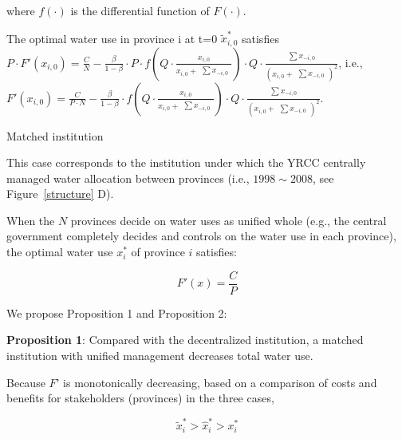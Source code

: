 \documentclass{../nsr}
\begin{document}
\begin{case}
    where $f(\cdot)$ is the differential function of $F(\cdot)$.

    The optimal water use in province i at t=0 $\widetilde x_{i,0}^*$ satisfies $P \cdot F'(x_{i,0})=\frac{C}{N}-\frac{\beta}{1-\beta} \cdot P \cdot f(Q \cdot \frac{x_{i,0}}{x_{i,0} + \begin{matrix} \sum x_{-i,0} \end{matrix}}) \cdot Q \cdot \frac{\begin{matrix} \sum x_{-i,0} \end{matrix}}{(x_{i,0} + \begin{matrix} \sum x_{-i,0} \end{matrix})^2}$, i.e., $F'(x_{i,0})=\frac{C}{P \cdot N} - \frac{\beta}{1-\beta} \cdot f(Q \cdot \frac{x_{i,0}}{x_{i,0} + \begin{matrix} \sum x_{-i,0} \end{matrix}}) \cdot Q \cdot \frac{\begin{matrix} \sum x_{-i,0} \end{matrix}}{(x_{i,0} + \begin{matrix} \sum x_{-i,0} \end{matrix})^2}$.

\end{case}

\begin{case} Matched institution

    This case corresponds to the institution under which the YRCC centrally managed water allocation between provinces (i.e., $1998\sim2008$, see Figure~\ref{structure} D).

    When the $N$ provinces decide on water uses as unified whole (e.g., the central government completely decides and controls on the water use in each province), the optimal water use $x_i^*$ of province $i$ satisfies:

    $$F'(x)=\frac{C}{P}$$

\end{case}

We propose Proposition 1 and Proposition 2:

\textbf{Proposition 1}: Compared with the decentralized institution, a matched institution with unified management decreases total water use.

Because $F’$ is monotonically decreasing, based on a comparison of costs and benefits for stakeholders (provinces) in the three cases,

$$\widetilde x_i^*>\hat x_i^*>x_i^*$$
\end{document}
